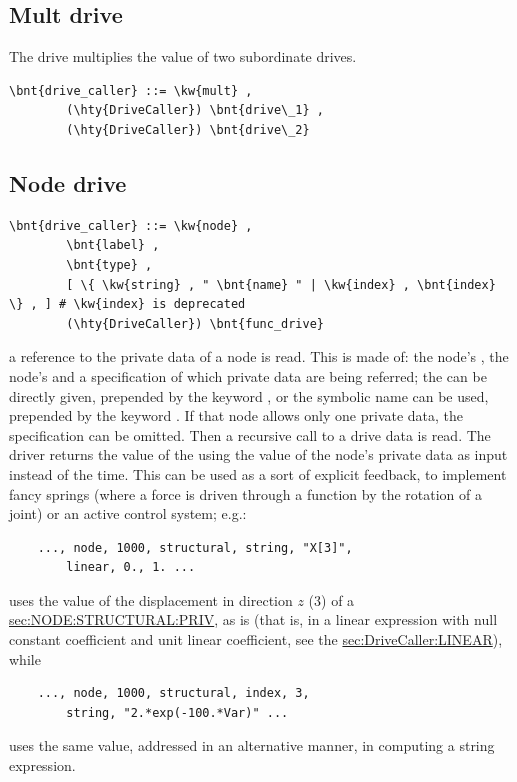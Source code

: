 \subsection{Mult drive}
The  drive multiplies the value of two subordinate drives.
\begin{Verbatim}[commandchars=\\\{\}]
    \bnt{drive_caller} ::= \kw{mult} ,
        (\hty{DriveCaller}) \bnt{drive\_1} ,
        (\hty{DriveCaller}) \bnt{drive\_2}
\end{Verbatim}


\subsection{Node drive}\label{sec:DriveCaller:NODE}
\begin{Verbatim}[commandchars=\\\{\}]
    \bnt{drive_caller} ::= \kw{node} ,
        \bnt{label} ,
        \bnt{type} ,
        [ \{ \kw{string} , " \bnt{name} " | \kw{index} , \bnt{index} \} , ] # \kw{index} is deprecated
        (\hty{DriveCaller}) \bnt{func_drive}
\end{Verbatim}
a reference to the private data of a node is read.
This is made of: the node's , the node's 
and a specification of which private data are being referred;
the  can be directly given, prepended by the keyword
, or the symbolic name  can be used, prepended by 
the keyword .
If that node allows only one private data, the specification 
can be omitted.
Then a recursive call to a drive data is read. 
The driver returns the value of the  
 using the value of the 
node's private data as input instead of the time. 
This can be used as a sort of explicit feedback, to implement fancy
springs (where a force is driven through a function by the rotation
of a joint) or an active control system; e.g.:
\begin{verbatim}
    ..., node, 1000, structural, string, "X[3]",
        linear, 0., 1. ...
\end{verbatim}
uses the value of the displacement in direction $z$ (3) of a
\hyperref{\kw{structural node}}{\kw{structural node}, Section~}{}{sec:NODE:STRUCTURAL:PRIV},
as is (that is, in a linear expression with null constant coefficient 
and unit linear coefficient, see the 
\hyperref{\kw{linear} drive}{\kw{linear} drive, Section~}{}{sec:DriveCaller:LINEAR}),
while
\begin{verbatim}
    ..., node, 1000, structural, index, 3,
        string, "2.*exp(-100.*Var)" ...
\end{verbatim}
uses the same value, addressed in an alternative manner, in computing
a string expression.

